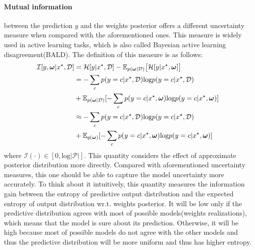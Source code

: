 \paragraph{Mutual information} between the prediction $y$ and the weights posterior offers a different uncertainty measure when compared with the aforementioned ones. This measure is widely used in active learning tasks\cite{houlsby2011bayesian}, which is also called Bayesian active learning disagreement(BALD). The definition of this measure is as follows:
\begin{equation}\label{mi}	
\begin{aligned}
\mathcal I[y,\boldsymbol \omega|x^\star, \mathcal D] &= \mathcal H[y|x^\star, \mathcal D] - \mathbb E_{p(\boldsymbol \omega| \mathcal D)}\big[\mathcal H[y|x^\star, \boldsymbol \omega] \big] \\
&= -\sum_{c}p(y=c|x^\star, \mathcal D)\text{log}p(y=c|x^\star, \mathcal D) \\ &+ \mathbb E_{p(\boldsymbol \omega|\mathcal D)}[-\sum_{c}p(y=c|x^\star, \boldsymbol \omega)\text{log}p(y=c|x^\star, \boldsymbol \omega)] \\
&\approx -\sum_{c}p(y=c|x^\star, \mathcal D)\text{log}p(y=c|x^\star, \mathcal D) \\ &+ \mathbb E_{q(\boldsymbol \omega)}[-\sum_{c}p(y=c|x^\star, \boldsymbol \omega)\text{log}p(y=c|x^\star, \boldsymbol \omega)]
\end{aligned}
\end{equation}
where $\mathcal I(\cdot) \in [0,\text{log}{|\mathcal P|}]$.
This quantity considers the effect of approximate posterior distribution more directly. Compared with aforementioned uncertainty measures, this one should be able to capture the model uncertainty more accurately. To think about it intuitively, this quantity measures the information gain between the entropy of predictive output distribution and the expected entropy of output distribution wr.t. weights posterior. It will be low only if the predictive distribution agrees with most of possible models(weights realizations), which means that the model is sure about its prediction. Otherwise, it will be high because most of possible models do not agree with the other models and thus the predictive distribution will be more uniform and thus has higher entropy.

